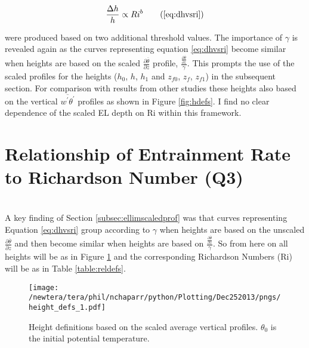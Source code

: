 \begin{equation}
\frac{\Delta h}{h} \propto Ri ^{b} \tag{\ref{eq:dhvsri}}
\end{equation}

were produced based on two additional threshold values. The importance of $\gamma$ is revealed again as the curves representing
equation \ref{eq:dhvsri} become similar when heights are based on the scaled $\frac{\partial \overline{\theta}}{\partial z}$
profile, $\frac{\frac{\partial \overline{\theta}}{\partial z}}{\gamma}$.  This prompts the use of the scaled profiles for the heights
($h_{0}$, $h$, $h_{1}$ and $z_{f0}$, $z_{f}$, $z_{f1}$) in the subsequent section.  For comparison with results from other studies these heights also based on the vertical $\overline{w^{'}\theta^{'}}$ profiles as shown in Figure \ref{fig:hdefs}. I find no clear dependence of the scaled \acs{EL} depth on \acs{Ri} within this framework. \\

\clearpage

\section{Relationship of Entrainment Rate to Richardson Number (Q3)}
\FloatBarrier
\label{sec:weri}
\\

A key finding of Section \ref{subsec:ellimscaledprof} was that curves representing Equation \ref{eq:dhvsri} group according
to $\gamma$ when heights are based on the unscaled $\frac{\partial \overline{\theta}}{\partial z}$ and then become similar
when heights are based on $\frac{\frac{\partial \overline{\theta}}{\partial z}}{\gamma}$.  So from here on all heights will be as in
Figure \ref{fig:hdefs1} and the corresponding Richardson Numbers (\acs{Ri}) will be as in Table \ref{table:reldefs}.\\ 

\begin{figure}[htbp]
    \centering
    \texttt{[image: /newtera/tera/phil/nchaparr/python/Plotting/Dec252013/pngs/height\_defs\_1.pdf]}
    \caption[Height definitions]{Height definitions based on the scaled average vertical profiles. $\theta_{0}$ is the initial potential temperature.}
    \label{fig:hdefs1}   %
\end{figure}

